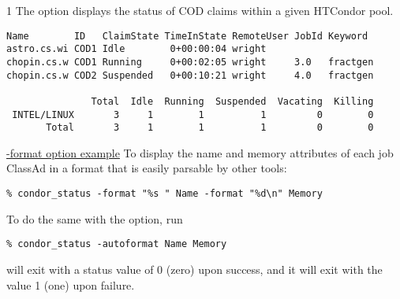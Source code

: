 \begin{ManPage}{\label{man-condor-status}}{1}
The  option displays the status of COD
claims within a given HTCondor pool. 

\footnotesize
\begin{verbatim}
Name        ID   ClaimState TimeInState RemoteUser JobId Keyword
astro.cs.wi COD1 Idle        0+00:00:04 wright
chopin.cs.w COD1 Running     0+00:02:05 wright     3.0   fractgen
chopin.cs.w COD2 Suspended   0+00:10:21 wright     4.0   fractgen

               Total  Idle  Running  Suspended  Vacating  Killing
 INTEL/LINUX       3     1        1          1         0        0
       Total       3     1        1          1         0        0
\end{verbatim}
\normalsize

\underline{-format option example}
To display the name and memory attributes of each job ClassAd in a format
that is easily parsable by other tools:
\begin{verbatim}
% condor_status -format "%s " Name -format "%d\n" Memory
\end{verbatim}
To do the same with the  option, run
\begin{verbatim}
% condor_status -autoformat Name Memory
\end{verbatim}


\ExitStatus

 will exit with a status value of 0 (zero) upon success,
and it will exit with the value 1 (one) upon failure.

\end{ManPage}

